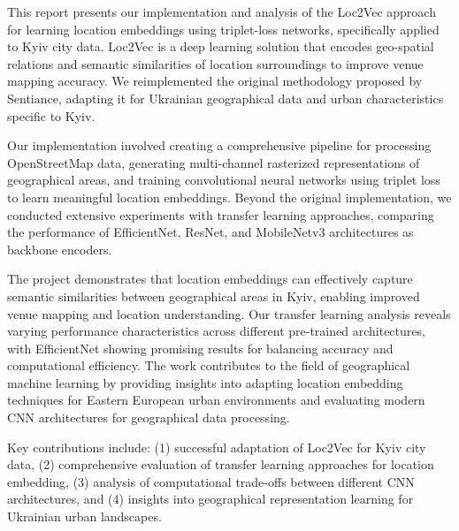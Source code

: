 This report presents our implementation and analysis of the Loc2Vec approach for learning location embeddings using triplet-loss networks, specifically applied to Kyiv city data. Loc2Vec is a deep learning solution that encodes geo-spatial relations and semantic similarities of location surroundings to improve venue mapping accuracy. We reimplemented the original methodology proposed by Sentiance, adapting it for Ukrainian geographical data and urban characteristics specific to Kyiv.

Our implementation involved creating a comprehensive pipeline for processing OpenStreetMap data, generating multi-channel rasterized representations of geographical areas, and training convolutional neural networks using triplet loss to learn meaningful location embeddings. Beyond the original implementation, we conducted extensive experiments with transfer learning approaches, comparing the performance of EfficientNet, ResNet, and MobileNetv3 architectures as backbone encoders.

The project demonstrates that location embeddings can effectively capture semantic similarities between geographical areas in Kyiv, enabling improved venue mapping and location understanding. Our transfer learning analysis reveals varying performance characteristics across different pre-trained architectures, with EfficientNet showing promising results for balancing accuracy and computational efficiency. The work contributes to the field of geographical machine learning by providing insights into adapting location embedding techniques for Eastern European urban environments and evaluating modern CNN architectures for geographical data processing.

Key contributions include: (1) successful adaptation of Loc2Vec for Kyiv city data, (2) comprehensive evaluation of transfer learning approaches for location embedding, (3) analysis of computational trade-offs between different CNN architectures, and (4) insights into geographical representation learning for Ukrainian urban landscapes.
